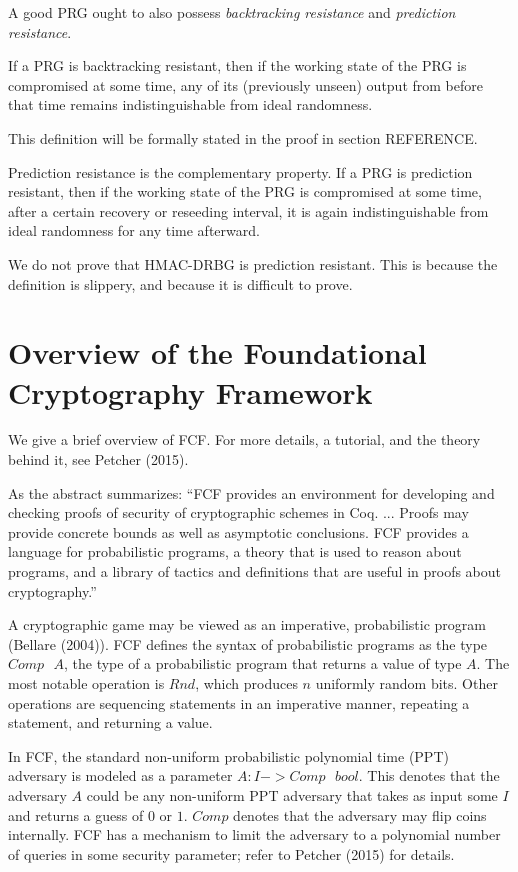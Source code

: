 \documentclass[12pt,lot, lof]{puthesis}
\newcommand{\s} {\textrm{ }}
\begin{document}
A good PRG ought to also possess \emph{backtracking resistance} and \emph{prediction resistance}.

If a PRG is backtracking resistant, then if the working state of the PRG is compromised at some time, any of its (previously unseen) output from before that time remains indistinguishable from ideal randomness.

This definition will be formally stated in the proof in section REFERENCE.

Prediction resistance is the complementary property. If a PRG is prediction resistant, then if the working state of the PRG is compromised at some time, after a certain recovery or reseeding interval, it is again indistinguishable from ideal randomness for any time afterward.


We do not prove that HMAC-DRBG is prediction resistant. This is because the definition is slippery, and because it is difficult to prove.

\section{Overview of the Foundational Cryptography Framework}

We give a brief overview of FCF. For more details, a tutorial, and the theory behind it, see Petcher (2015).

As the abstract summarizes: ``FCF provides an environment for developing and checking proofs of security of cryptographic schemes in Coq. ...  Proofs may provide concrete bounds as well as asymptotic conclusions. FCF provides a language for probabilistic programs, a theory that is used to reason about programs, and a library of tactics and definitions that are useful in proofs about cryptography.'' 

A cryptographic game may be viewed as an imperative, probabilistic program (Bellare (2004)). FCF defines the syntax of probabilistic programs as the type $Comp \s A$, the type of a probabilistic program that returns a value of type $A$. The most notable operation is $Rnd$, which produces $n$ uniformly random bits. Other operations are sequencing statements in an imperative manner, repeating a statement, and returning a value.

In FCF, the standard non-uniform probabilistic polynomial time (PPT) adversary is modeled as a parameter $A : I -> Comp \s bool$. This denotes that the adversary $A$ could be any non-uniform PPT adversary that takes as input some $I$ and returns a guess of $0$ or $1$. $Comp$ denotes that the adversary may flip coins internally. FCF has a mechanism to limit the adversary to a polynomial number of queries in some security parameter; refer to Petcher (2015) for details.
\end{document}

